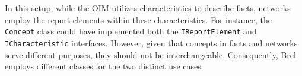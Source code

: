 In this setup, while the OIM utilizes characteristics to describe facts, networks employ the report elements within these characteristics. 
For instance, the \texttt{Concept} class could have implemented both the \texttt{IReportElement} and \texttt{ICharacteristic} interfaces. 
However, given that concepts in facts and networks serve different purposes, they should not be interchangeable. 
Consequently, Brel employs different classes for the two distinct use cases.


